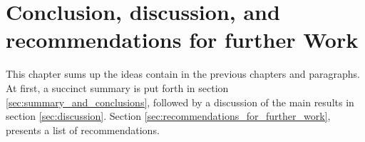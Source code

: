 \documentclass[../Main/thesis.tex]{subfiles}
\begin{document}
	\chapter[Conclusions]{Conclusion, discussion, and recommendations for further Work}
	\label{sec:conclusions}
	 This chapter sums up the ideas contain in the previous chapters and paragraphs. At first, a succinct summary is put forth in section \ref{sec:summary_and_conclusions}, followed by a discussion of the main results in section \ref{sec:discussion}. Section \ref{sec:recommendations_for_further_work}, presents a list of recommendations.
	
\end{document}
